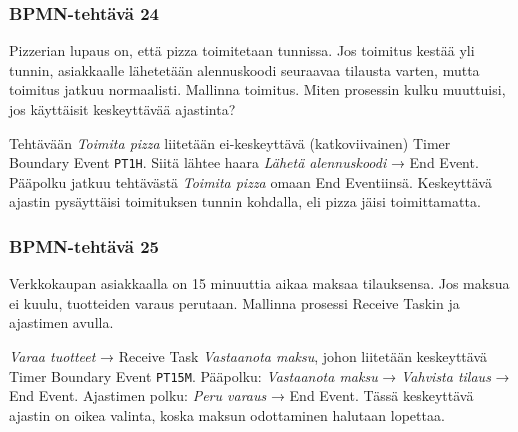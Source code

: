 \documentclass[
  finnish,
  letterpaper,
  DIV=11,
  numbers=noendperiod,
  oneside]{scrreprt}
\begin{document}
\subsubsection{BPMN-tehtävä 24}\label{bpmn-tehtuxe4vuxe4-24}

Pizzerian lupaus on, että pizza toimitetaan tunnissa. Jos toimitus
kestää yli tunnin, asiakkaalle lähetetään alennuskoodi seuraavaa
tilausta varten, mutta toimitus jatkuu normaalisti. Mallinna toimitus.
Miten prosessin kulku muuttuisi, jos käyttäisit keskeyttävää ajastinta?

\begin{tcolorbox}[enhanced jigsaw, arc=.35mm, bottomrule=.15mm, bottomtitle=1mm, breakable, colback=white, colbacktitle=quarto-callout-tip-color!10!white, colframe=quarto-callout-tip-color-frame, coltitle=black, left=2mm, leftrule=.75mm, opacityback=0, opacitybacktitle=0.6, rightrule=.15mm, title=\textcolor{quarto-callout-tip-color}{\faLightbulb}\hspace{0.5em}{Malliratkaisu}, titlerule=0mm, toprule=.15mm, toptitle=1mm]

Tehtävään \emph{Toimita pizza} liitetään ei-keskeyttävä (katkoviivainen)
Timer Boundary Event \texttt{PT1H}. Siitä lähtee haara \emph{Lähetä
alennuskoodi} → End Event. Pääpolku jatkuu tehtävästä \emph{Toimita
pizza} omaan End Eventiinsä. Keskeyttävä ajastin pysäyttäisi toimituksen
tunnin kohdalla, eli pizza jäisi toimittamatta.

\end{tcolorbox}

\subsubsection{BPMN-tehtävä 25}\label{bpmn-tehtuxe4vuxe4-25}

Verkkokaupan asiakkaalla on 15 minuuttia aikaa maksaa tilauksensa. Jos
maksua ei kuulu, tuotteiden varaus perutaan. Mallinna prosessi Receive
Taskin ja ajastimen avulla.

\begin{tcolorbox}[enhanced jigsaw, arc=.35mm, bottomrule=.15mm, bottomtitle=1mm, breakable, colback=white, colbacktitle=quarto-callout-tip-color!10!white, colframe=quarto-callout-tip-color-frame, coltitle=black, left=2mm, leftrule=.75mm, opacityback=0, opacitybacktitle=0.6, rightrule=.15mm, title=\textcolor{quarto-callout-tip-color}{\faLightbulb}\hspace{0.5em}{Malliratkaisu}, titlerule=0mm, toprule=.15mm, toptitle=1mm]

\emph{Varaa tuotteet} → Receive Task \emph{Vastaanota maksu}, johon
liitetään keskeyttävä Timer Boundary Event \texttt{PT15M}. Pääpolku:
\emph{Vastaanota maksu} → \emph{Vahvista tilaus} → End Event. Ajastimen
polku: \emph{Peru varaus} → End Event. Tässä keskeyttävä ajastin on
oikea valinta, koska maksun odottaminen halutaan lopettaa.

\end{tcolorbox}
\end{document}
